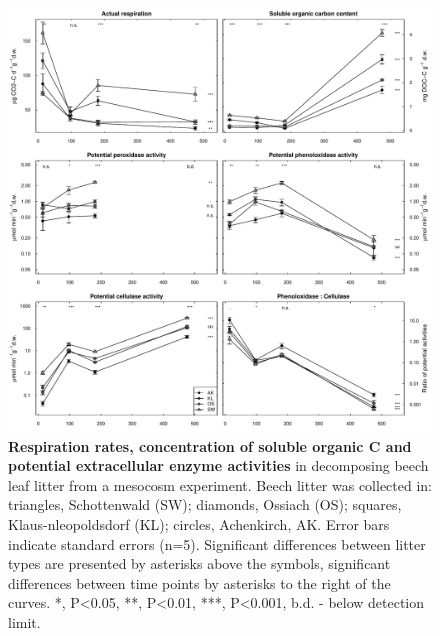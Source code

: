 \documentclass[10pt]{article}
\begin{document}
\begin{flushleft}
\newpage
\begin{figure}[!ht]
\begin{center}
\includegraphics{ligpaper-enz}
\end{center}
\caption{
{\bf Respiration rates, concentration of soluble organic C and potential extracellular enzyme activities} in decomposing beech leaf litter from a mesocosm experiment. Beech litter was collected in: triangles, Schottenwald (SW); diamonds, Ossiach (OS); squares, Klaus-nleopoldsdorf (KL); circles, Achenkirch, AK. Error bars indicate standard errors (n=5). Significant differences between litter types are presented by asterisks above the symbols, significant differences between time points by asterisks to the right of the curves. *, P\textless 0.05, **, P\textless 0.01, ***, P\textless 0.001, b.d. - below detection limit.}
\end{figure}


\end{flushleft}
\end{document}
